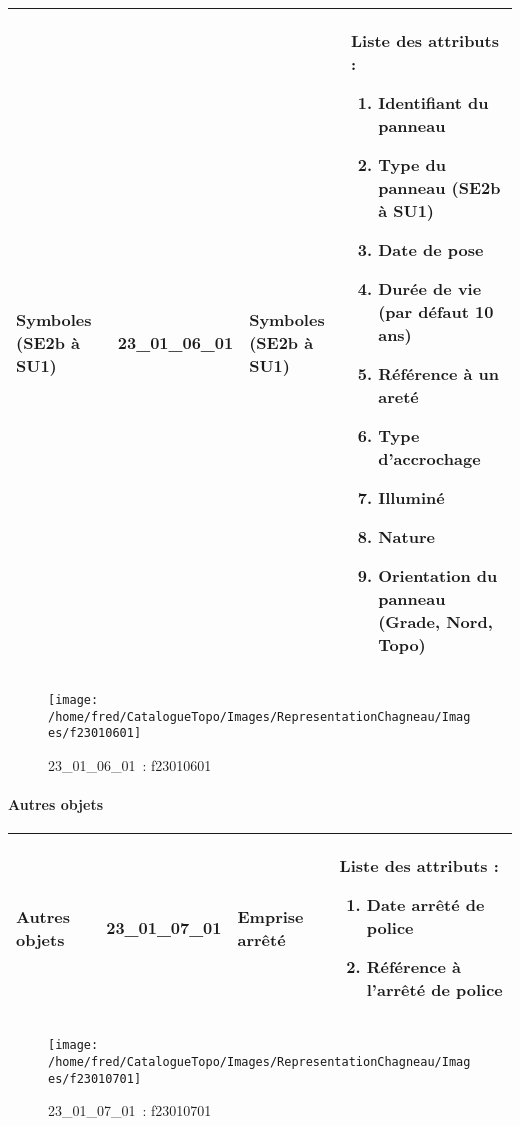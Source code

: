 \documentclass[12pt,titlepage]{book}
\begin{document}
\renewcommand{\arraystretch}{1.2}
\begin{supertabular}{|p{10cm}|c|p{13cm}|p{12cm}|}
 Symboles (SE2b à SU1) & 23\_01\_06\_01 & Symboles (SE2b à SU1) & Liste des attributs :
\begin{enumerate}
  \item Identifiant du panneau  \item Type du panneau (SE2b à SU1)  \item Date de pose  \item Durée de vie (par défaut 10 ans)  \item Référence à un areté  \item Type d'accrochage  \item Illuminé  \item Nature  \item Orientation du panneau (Grade, Nord, Topo)\end{enumerate}
\\
\hline
\end{supertabular}
\begin{figure}[h!]
  \hfill         %
  \begin{minipage}[t]{3cm}
    \begin{center}
      \texttt{[image: /home/fred/CatalogueTopo/Images/RepresentationChagneau/Images/f23010601]}
      \caption[~23\_01\_06\_01]{\small{23\_01\_06\_01~:} \tiny{f23010601}}\label{f23010601}
    \end{center}
  \end{minipage}
\end{figure}


\paragraph{Autres objets}
\noindent
\vspace{\baselineskip}

\renewcommand{\arraystretch}{1.2}
\begin{supertabular}{|p{10cm}|c|p{13cm}|p{12cm}|}
 Autres objets & 23\_01\_07\_01 & Emprise arrêté & Liste des attributs :
\begin{enumerate}
  \item Date arrêté de police  \item Référence à l'arrêté de police\end{enumerate}
\\
\hline
\end{supertabular}
\begin{figure}[h!]
  \hfill         %
  \begin{minipage}[t]{3cm}
    \begin{center}
      \texttt{[image: /home/fred/CatalogueTopo/Images/RepresentationChagneau/Images/f23010701]}
      \caption[~23\_01\_07\_01]{\small{23\_01\_07\_01~:} \tiny{f23010701}}\label{f23010701}
    \end{center}
  \end{minipage}
\end{figure}
\end{document}
